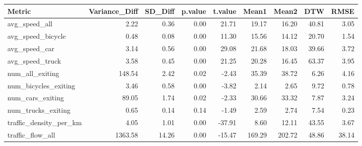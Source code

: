 \begin{table}[ht]
\centering
\begin{tabular}{lrrrrrrrr}
  \hline
Metric & Variance\_Diff & SD\_Diff & p.value & t.value & Mean1 & Mean2 & DTW & RMSE \\ 
  \hline
avg\_speed\_all & 2.22 & 0.36 & 0.00 & 21.71 & 19.17 & 16.20 & 40.81 & 3.05 \\ 
  avg\_speed\_bicycle & 0.48 & 0.08 & 0.00 & 11.30 & 15.56 & 14.12 & 20.70 & 1.54 \\ 
  avg\_speed\_car & 3.14 & 0.56 & 0.00 & 29.08 & 21.68 & 18.03 & 39.66 & 3.72 \\ 
  avg\_speed\_truck & 3.58 & 0.45 & 0.00 & 21.25 & 20.28 & 16.45 & 63.37 & 3.95 \\ 
  num\_all\_exiting & 148.54 & 2.42 & 0.02 & -2.43 & 35.39 & 38.72 & 6.26 & 4.16 \\ 
  num\_bicycles\_exiting & 3.46 & 0.58 & 0.00 & -3.82 & 2.14 & 2.65 & 9.72 & 0.78 \\ 
  num\_cars\_exiting & 89.05 & 1.74 & 0.02 & -2.33 & 30.66 & 33.32 & 7.87 & 3.24 \\ 
  num\_trucks\_exiting & 0.65 & 0.14 & 0.14 & -1.49 & 2.59 & 2.74 & 7.54 & 0.23 \\ 
  traffic\_density\_per\_km & 4.05 & 1.01 & 0.00 & -37.91 & 8.60 & 12.11 & 43.55 & 3.67 \\ 
  traffic\_flow\_all & 1363.58 & 14.26 & 0.00 & -15.47 & 169.29 & 202.72 & 48.86 & 38.14 \\ 
   \hline
\end{tabular}
\end{table}
